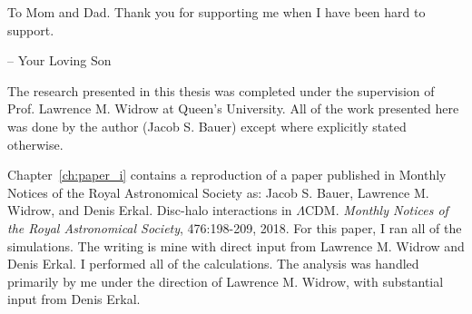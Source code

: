 \begin{center}
\noindent To Mom and Dad. Thank you for supporting me when I have been hard to support.

-- Your Loving Son
\end{center}

\clearpage 











The research presented in this thesis was completed under the supervision of Prof.
Lawrence M. Widrow at Queen’s University. All of the work presented here was done
by the author (Jacob S. Bauer) except where explicitly stated otherwise.

Chapter~\ref{ch:paper_i} contains a reproduction of a paper published in  Monthly Notices of the
Royal Astronomical Society as: Jacob S. Bauer, Lawrence M. Widrow, and Denis Erkal. Disc-halo interactions in $\Lambda$CDM. \textit{Monthly Notices of the Royal Astronomical Society}, 476:198-209,
2018. For this paper, I ran all of the simulations. The writing is mine with direct input from Lawrence M. Widrow and Denis Erkal. I performed all of the calculations. The analysis was handled primarily by me under the direction of Lawrence M. Widrow, with substantial input from Denis Erkal.

